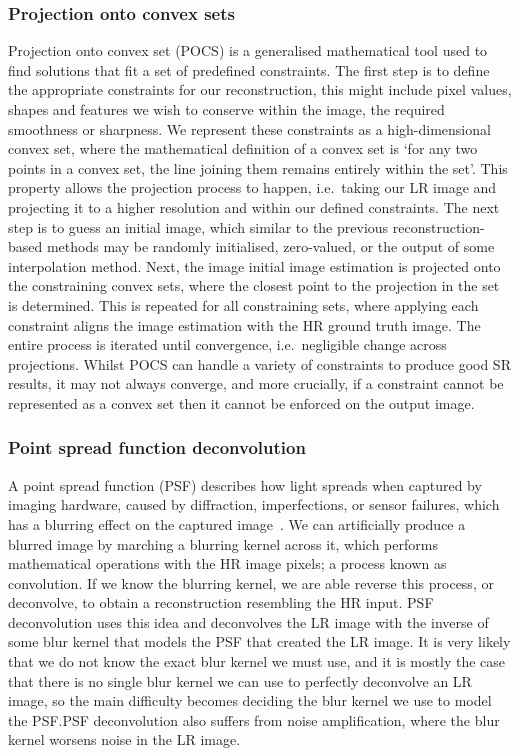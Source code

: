 \subsubsection{Projection onto convex sets}
Projection onto convex set (POCS) is a generalised mathematical tool used to find solutions that fit a set of predefined constraints. The first step is to define the appropriate constraints for our reconstruction, this might include pixel values, shapes and features we wish to conserve within the image, the required smoothness or sharpness. We represent these constraints as a high-dimensional convex set, where the mathematical definition of a convex set is `for any two points in a convex set, the line joining them remains entirely within the set'. This property allows the projection process to happen, i.e.\ taking our LR image and projecting it to a higher resolution and within our defined constraints. The next step is to guess an initial image, which similar to the previous reconstruction-based methods may be randomly initialised, zero-valued, or the output of some interpolation method. Next, the image initial image estimation is projected onto the constraining convex sets, where the closest point to the projection in the set is determined. This is repeated for all constraining sets, where applying each constraint aligns the image estimation with the HR ground truth image. The entire process is iterated until convergence, i.e.\ negligible change across projections. Whilst POCS can handle a variety of constraints to produce good SR results, it may not always converge, and more crucially, if a constraint cannot be represented as a convex set then it cannot be enforced on the output image.

\subsubsection{Point spread function deconvolution}
A point spread function (PSF) describes how light spreads when captured by imaging hardware, caused by diffraction, imperfections, or sensor failures, which has a blurring effect on the captured image~\cite{ref}. We can artificially produce a blurred image by marching a blurring kernel across it, which performs mathematical operations with the HR image pixels; a process known as convolution. If we know the blurring kernel, we are able reverse this process, or deconvolve, to obtain a reconstruction resembling the HR input. PSF deconvolution uses this idea and deconvolves the LR image with the inverse of some blur kernel that models the PSF that created the LR image. It is very likely that we do not know the exact blur kernel we must use, and it is mostly the case that there is no single blur kernel we can use to perfectly deconvolve an LR image, so the main difficulty becomes deciding the blur kernel we use to model the PSF.\@ PSF deconvolution also suffers from noise amplification, where the blur kernel worsens noise in the LR image.

